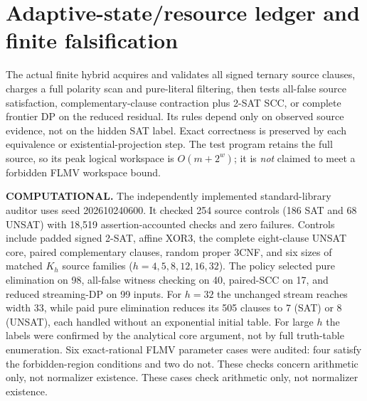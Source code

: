 \documentclass[11pt]{article}
\begin{document}
\section{Adaptive-state/resource ledger and finite falsification}
The actual finite hybrid acquires and validates all signed ternary source clauses, charges a full polarity scan and pure-literal filtering, then tests all-false source satisfaction, complementary-clause contraction plus 2-SAT SCC, or complete frontier DP on the reduced residual. Its rules depend only on observed source evidence, not on the hidden SAT label. Exact correctness is preserved by each equivalence or existential-projection step. The test program retains the full source, so its peak logical workspace is $O(m+2^w)$; it is \emph{not} claimed to meet a forbidden FLMV workspace bound.

\noindent\textbf{COMPUTATIONAL.} The independently implemented standard-library auditor uses seed 202610240600. It checked 254 source controls (186 SAT and 68 UNSAT) with 18,519 assertion-accounted checks and zero failures. Controls include padded signed 2-SAT, affine XOR3, the complete eight-clause UNSAT core, paired complementary clauses, random proper 3CNF, and six sizes of matched $K_h$ source families ($h=4,5,8,12,16,32$). The policy selected pure elimination on 98, all-false witness checking on 40, paired-SCC on 17, and reduced streaming-DP on 99 inputs. For $h=32$ the unchanged stream reaches width 33, while paid pure elimination reduces its 505 clauses to 7 (SAT) or 8 (UNSAT), each handled without an exponential initial table. For large $h$ the labels were confirmed by the analytical core argument, not by full truth-table enumeration. Six exact-rational FLMV parameter cases were audited: four satisfy the forbidden-region conditions and two do not. These checks concern arithmetic only, not normalizer existence. These cases check arithmetic only, not normalizer existence.
\end{document}
